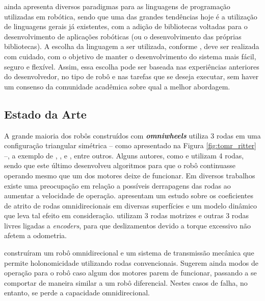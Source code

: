 \cite{craig2017introduction} ainda apresenta diversos paradigmas para as linguagens de programação utilizadas em robótica, sendo que uma das grandes tendências hoje é a utilização de linguagens gerais já existentes, com a adição de bibliotecas voltadas para o desenvolvimento de aplicações robóticas (ou o desenvolvimento das próprias bibliotecas). A escolha da linguagem a ser utilizada, conforme \cite{siciliano2016springer}, deve ser realizada com cuidado, com o objetivo de manter o desenvolvimento do sistema mais fácil, seguro e flexível. Assim, essa escolha pode ser baseada nas experiências anteriores do desenvolvedor, no tipo de robô e nas tarefas que se deseja executar, sem haver um consenso da comunidade acadêmica sobre qual a melhor abordagem.

\subsection{Estado da Arte}


A grande maioria dos robôs construídos com \textbf{\emph{omniwheels}} utiliza 3 rodas em uma configuração triangular simétrica -- como apresentado na Figura \ref{fig:tomr_ritter} --, a exemplo de \cite{ritter2016modelagem}, \cite{samani2007comprehensive}, \cite{williams2002dynamic} e \cite{indiveri2009swedish}, entre outros. Alguns autores, como \cite{krinkin2015design} e \cite{rojas2006holonomic} utilizam 4 rodas, sendo que este último desenvolveu algoritmos para que o robô continuasse operando mesmo que um dos motores deixe de funcionar. Em diversos trabalhos existe uma preocupação em relação a possíveis derrapagens das rodas ao aumentar a velocidade de operação. \cite{williams2002dynamic} apresentam um estudo sobre os coeficientes de atrito de rodas omnidirecionais em diversas superfícies e um modelo dinâmico que leva tal efeito em consideração. \cite{samani2007comprehensive} utilizam 3 rodas motrizes e outras 3 rodas livres ligadas a \textit{encoders}, para que deslizamentos devido a torque excessivo não afetem a odometria.

\cite{jung2001fault} construíram um robô omnidirecional e um sistema de transmissão mecânica que permite holonomicidade utilizando rodas convencionais. Sugerem ainda modos de operação para o robô caso algum dos motores parem de funcionar, passando a se comportar de maneira similar a um robô diferencial. Nestes casos de falha, no entanto, se perde a capacidade omnidirecional.

